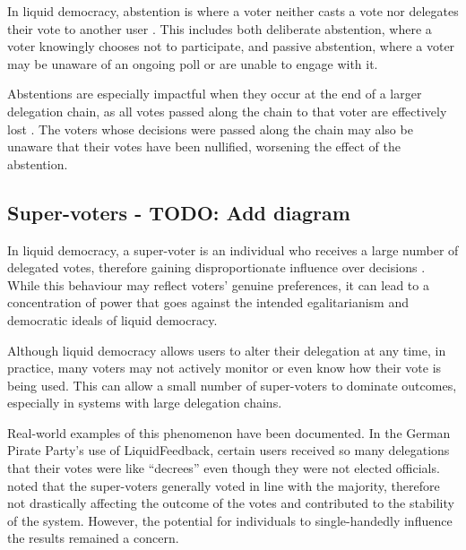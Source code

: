 In liquid democracy, abstention is where a voter neither casts a vote nor delegates their vote to another user \citep{brill_liquid_2022}. This includes both deliberate abstention, where a voter knowingly chooses not to participate, and passive abstention, where a voter may be unaware of an ongoing poll or are unable to engage with it.

Abstentions are especially impactful when they occur at the end of a larger delegation chain, as all votes passed along the chain to that voter are effectively lost \citep{brill_liquid_2022}. The voters whose decisions were passed along the chain may also be unaware that their votes have been nullified, worsening the effect of the abstention.

\subsection*{Super-voters - TODO: Add diagram}
In liquid democracy, a super-voter is an individual who receives a large number of delegated votes, therefore gaining disproportionate influence over decisions \citep{kling2015votingbehaviourpoweronline}. While this behaviour may reflect voters' genuine preferences, it can lead to a concentration of power that goes against the intended egalitarianism and democratic ideals of liquid democracy.

Although liquid democracy allows users to alter their delegation at any time, in practice, many voters may not actively monitor or even know how their vote is being used. This can allow a small number of super-voters to dominate outcomes, especially in systems with large delegation chains.

Real-world examples of this phenomenon have been documented. In the German Pirate Party's use of LiquidFeedback, certain users received so many delegations that their votes were like ``decrees'' \citep{sven_becker_liquid_2012,kling2015votingbehaviourpoweronline} even though they were not elected officials. \cite{kling2015votingbehaviourpoweronline} noted that the super-voters generally voted in line with the majority, therefore not drastically affecting the outcome of the votes and contributed to the stability of the system. However, the potential for individuals to single-handedly influence the results remained a concern.

